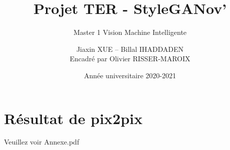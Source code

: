 \documentclass[a4paper, 12pt]{report}
\institute{Université de Paris}
\title{Projet TER - StyleGANov'}
\subtitle{Master 1 Vision Machine Intelligente}
\author{Jiaxin \textsc{XUE} -- Billal \textsc{IHADDADEN}\\
{\small Encadré par Olivier \textsc{RISSER-MAROIX}}}
\date{Année universitaire 2020-2021}
\begin{document}
    \maketitle

    \romantableofcontents

    
    
    
    
    
    
    
    
    
    
    
    
    
    
	\printbibliography[heading=bibintoc,title={Références}]
	
	\appendix
	
	\chapter{Résultat de pix2pix}
	
	Veuillez voir Annexe.pdf


	
\end{document}
